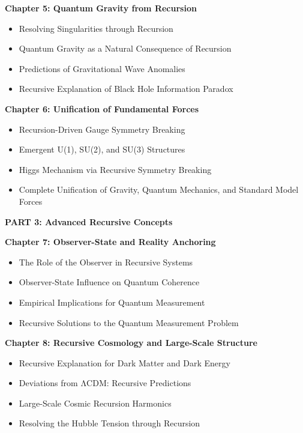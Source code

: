 \documentclass[]{article}
\begin{document}
\textbf{Chapter 5: Quantum Gravity from Recursion}

\begin{itemize}
\item
  Resolving Singularities through Recursion
\item
  Quantum Gravity as a Natural Consequence of Recursion
\item
  Predictions of Gravitational Wave Anomalies
\item
  Recursive Explanation of Black Hole Information Paradox
\end{itemize}

\textbf{Chapter 6: Unification of Fundamental Forces}

\begin{itemize}
\item
  Recursion-Driven Gauge Symmetry Breaking
\item
  Emergent U(1), SU(2), and SU(3) Structures
\item
  Higgs Mechanism via Recursive Symmetry Breaking
\item
  Complete Unification of Gravity, Quantum Mechanics, and Standard Model
  Forces
\end{itemize}

\textbf{PART 3: Advanced Recursive Concepts}

\textbf{Chapter 7: Observer-State and Reality Anchoring}

\begin{itemize}
\item
  The Role of the Observer in Recursive Systems
\item
  Observer-State Influence on Quantum Coherence
\item
  Empirical Implications for Quantum Measurement
\item
  Recursive Solutions to the Quantum Measurement Problem
\end{itemize}

\textbf{Chapter 8: Recursive Cosmology and Large-Scale Structure}

\begin{itemize}
\item
  Recursive Explanation for Dark Matter and Dark Energy
\item
  Deviations from ΛCDM: Recursive Predictions
\item
  Large-Scale Cosmic Recursion Harmonics
\item
  Resolving the Hubble Tension through Recursion
\end{itemize}
\end{document}
